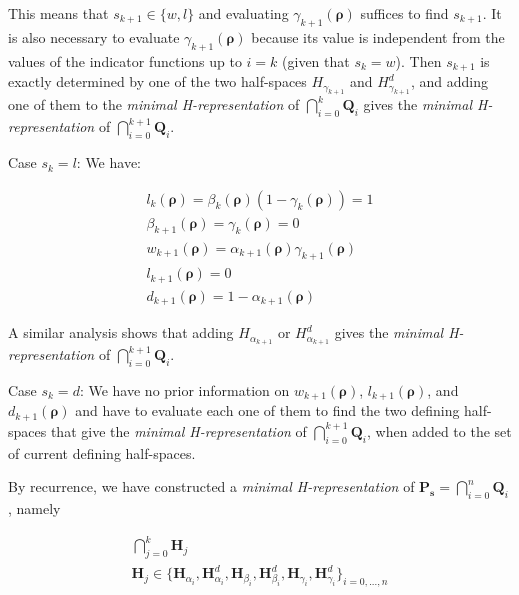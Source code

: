 \noindent This means that $s_{k+1}\in\{w,l\}$ and evaluating $\gamma_{k+1}(\boldsymbol\rho)$ suffices to find $s_{k+1}$. It is also necessary to evaluate $\gamma_{k+1}(\boldsymbol\rho)$ because its value is independent from the values of the indicator functions up to $i=k$ (given that $s_{k}=w$). Then $s_{k+1}$ is exactly determined by one of the two half-spaces $H_{\gamma_{k+1}}$ and $H^{d}_{\gamma_{k+1}}$, and adding one of them to the \textit{minimal H-representation} of $\bigcap_{i=0}^{k} \textbf{Q}_{i}$ gives the \textit{minimal H-representation} of $\bigcap_{i=0}^{k+1} \textbf{Q}_{i}$.

Case $s_{k}=l$: We have:

\begin{equation}
\begin{array}{l}
l_{k}(\boldsymbol\rho)=\beta_{k}(\boldsymbol\rho)(1-\gamma_{k}(\boldsymbol\rho))=1\\
\beta_{k+1}(\boldsymbol\rho)=\gamma_{k}(\boldsymbol\rho)=0\\
w_{k+1}(\boldsymbol\rho)=\alpha_{k+1}(\boldsymbol\rho)\gamma_{k+1}(\boldsymbol\rho)\\
l_{k+1}(\boldsymbol\rho)=0\\
d_{k+1}(\boldsymbol\rho)=1-\alpha_{k+1}(\boldsymbol\rho)
\end{array}
\end{equation}

\noindent A similar analysis shows that adding $H_{\alpha_{k+1}}$ or $H^{d}_{\alpha_{k+1}}$ gives the \textit{minimal H-representation} of $\bigcap_{i=0}^{k+1} \textbf{Q}_{i}$.

Case $s_{k}=d$: We have no prior information on $w_{k+1}(\boldsymbol\rho)$, $l_{k+1}(\boldsymbol\rho)$, and $d_{k+1}(\boldsymbol\rho)$ and have to evaluate each one of them to find the two defining half-spaces that give the \textit{minimal H-representation} of $\bigcap_{i=0}^{k+1} \textbf{Q}_{i}$, when added to the set of current defining half-spaces.

By recurrence, we have constructed a \emph{minimal H-representation} of $\textbf{P}_{\boldsymbol s}=\bigcap_{i=0}^{n} \textbf{Q}_{i}$, namely

\begin{equation}
\begin{array}{l}
\bigcap_{j=0}^{k} \textbf{H}_{j}\\
\textbf{H}_{j}\in \{\textbf{H}_{\alpha_{i}}, \textbf{H}^{d}_{\alpha_{i}}, \textbf{H}_{\beta_{i}}, \textbf{H}^{d}_{\beta_{i}}, \textbf{H}_{\gamma_{i}}, \textbf{H}^{d}_{\gamma_{i}}\}_{i=0,...,n}
\end{array}
\label{eq:minRepresentation}
\end{equation}

